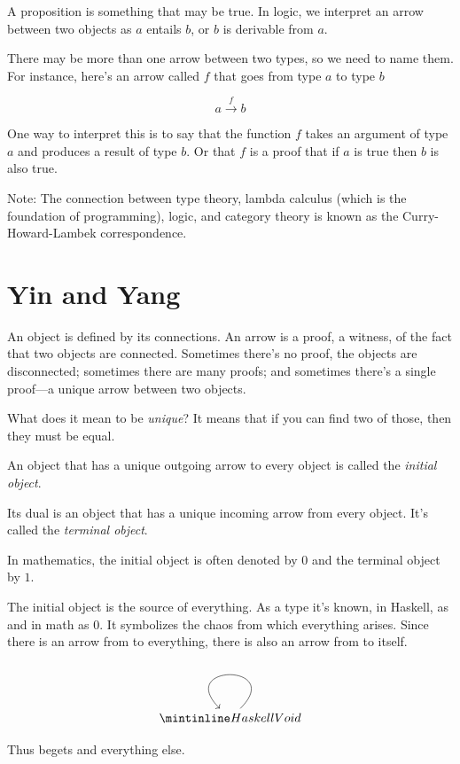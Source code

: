 \documentclass[DaoFP]{subfiles}
\begin{document}
A proposition is something that may be true. In logic, we interpret an arrow between two objects as $a$ entails $b$, or $b$ is derivable from $a$. 
\pagebreak

There may be more than one arrow between two types, so we need to name them. For instance, here's an arrow called $f$ that goes from type $a$ to type $b$

\[ a \xrightarrow f b \]

One way to interpret this is to say that the function $ f$ takes an argument of type $a$ and produces a result of type $b$. Or that $ f$ is a proof that if $a$ is true then $b$ is also true.

Note: The connection between type theory, lambda calculus (which is the foundation of programming), logic, and category theory is known as the Curry-Howard-Lambek correspondence.

\section{Yin and Yang}

An object is defined by its connections. An arrow is a proof, a witness, of the fact that two objects are connected. Sometimes there's no proof, the objects are disconnected; sometimes there are many proofs; and sometimes there's a single proof---a unique arrow between two objects.

What does it mean to be \emph{unique}? It means that if you can find two of those, then they must be equal.

An object that has a unique outgoing arrow to every object is called the \emph{initial object}.

Its dual is an object that has a unique incoming arrow from every object. It's called the \emph{terminal object}. 

In mathematics, the initial object is often denoted by $0$ and the terminal object by $1$.

The initial object is the source of everything. As a type it's known, in Haskell, as  and in math as $0$. It symbolizes the chaos from which everything arises. Since there is an arrow from  to everything, there is also an arrow from  to itself. 

\[
 \begin{tikzcd}
 \hask{Void}
 \arrow[loop]
 \end{tikzcd}
\]

Thus  begets  and everything else.
\end{document}

